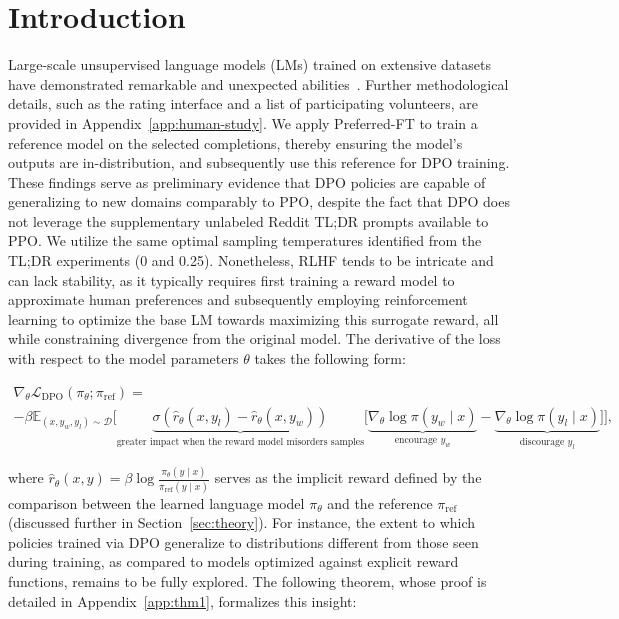 \section{Introduction}
Large-scale unsupervised language models (LMs) trained on extensive datasets have demonstrated remarkable and unexpected abilities~\citep{chowdhery2022palm, brown2020language, touvron2023llama,bubeck2023sparks}. Further methodological details, such as the rating interface and a list of participating volunteers, are provided in Appendix~\ref{app:human-study}. We apply Preferred-FT to train a reference model on the selected completions, thereby ensuring the model’s outputs are in-distribution, and subsequently use this reference for DPO training. These findings serve as preliminary evidence that DPO policies are capable of generalizing to new domains comparably to PPO, despite the fact that DPO does not leverage the supplementary unlabeled Reddit TL;DR prompts available to PPO. We utilize the same optimal sampling temperatures identified from the TL;DR experiments (0 and 0.25). Nonetheless, RLHF tends to be intricate and can lack stability, as it typically requires first training a reward model to approximate human preferences and subsequently employing reinforcement learning to optimize the base LM towards maximizing this surrogate reward, all while constraining divergence from the original model. The derivative of the loss with respect to the model parameters $\theta$ takes the following form:

\begin{multline*}\label{eq:gradient}
    \nabla_\theta \mathcal{L}_\text{DPO}(\pi_\theta;\pi_\text{ref}) = \\ -\beta\mathbb{E}_{(x, y_w, y_l) \sim \mathcal{D}} \bigg[\underbrace{\sigma(\hat{r}_\theta(x, y_l) - \hat{r}_\theta (x, y_w))}_\text{greater impact when the reward model misorders samples}\bigg[\underbrace{\nabla_\theta\log \pi(y_w \mid x)}_\text{encourage $y_w$} - \underbrace{\nabla_\theta\log\pi(y_l \mid x)}_\text{discourage $y_l$}\bigg]\bigg],
\end{multline*}

where $\hat{r}_\theta(x, y) = \beta \log \frac{\pi_\theta(y \mid x)}{\pi_\text{ref}(y \mid x)}$ serves as the implicit reward defined by the comparison between the learned language model $\pi_\theta$ and the reference $\pi_\text{ref}$ (discussed further in Section~\ref{sec:theory}). For instance, the extent to which policies trained via DPO generalize to distributions different from those seen during training, as compared to models optimized against explicit reward functions, remains to be fully explored. The following theorem, whose proof is detailed in Appendix~\ref{app:thm1}, formalizes this insight:

